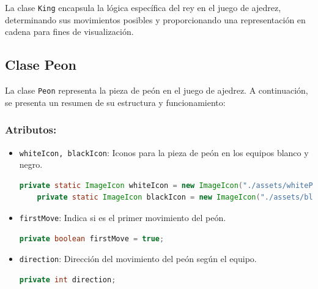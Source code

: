 \documentclass{article}
\begin{document}
La clase \texttt{King} encapsula la lógica específica del rey en el juego de ajedrez, determinando sus movimientos posibles y proporcionando una representación en cadena para fines de visualización.


\subsection{Clase Peon}
La clase \texttt{Peon} representa la pieza de peón en el juego de ajedrez. A continuación, se presenta un resumen de su estructura y funcionamiento:

\subsubsection{Atributos:}
\begin{itemize}
  \item \texttt{whiteIcon, blackIcon}: Iconos para la pieza de peón en los equipos blanco y negro.
  \begin{lstlisting}[language=java,caption={Atributos \texttt{whiteIcon} y \texttt{blackIcon} en la clase \texttt{Peon}}]
    private static ImageIcon whiteIcon = new ImageIcon("./assets/whitePeon.png");
    private static ImageIcon blackIcon = new ImageIcon("./assets/blackPeon.png");
  \end{lstlisting}
  
  \item \texttt{firstMove}: Indica si es el primer movimiento del peón.
  \begin{lstlisting}[language=java,caption={Atributo \texttt{firstMove} en la clase \texttt{Peon}}]
    private boolean firstMove = true;
  \end{lstlisting}

  \item \texttt{direction}: Dirección del movimiento del peón según el equipo.
  \begin{lstlisting}[language=java,caption={Atributo \texttt{direction} en la clase \texttt{Peon}}]
    private int direction;
  \end{lstlisting}
\end{itemize}
\end{document}
